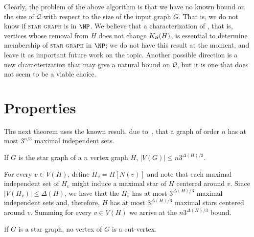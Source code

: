 Clearly, the problem of the above algorithm is that we have no known bound on the size of $\mathcal{Q}$ with respect to the size of the input graph $G$.
That is, we do not know if \textsc{star graph} is in $\NP$.
We believe that a characterization of , that is, vertices whose removal from $H$ does not change $K_{\mathcal{S}}(H)$, is essential to determine membership of \textsc{star graph} in $\NP$; we do not have this result at the moment, and leave it as important future work on the topic.
Another possible direction is a new characterization that may give a natural bound on $\mathcal{Q}$, but it is one that does not seem to be a viable choice.

\section{Properties}

The next theorem uses the known result, due to~\cite{moon_moser}, that a graph of order $n$ has at most $3^{n/3}$ maximal independent sets.

\begin{theorem}
    If $G$ is the star graph of a $n$ vertex graph $H$, $|V(G)| \leq n3^{\Delta(H)/3}$.
\end{theorem}

\begin{tproof}
    For every $v \in V(H)$, define $H_v = H[N(v)]$ and note that each maximal independent set of $H_v$ might induce a maximal star of $H$ centered around $v$.
    Since $|V(H_v)| \leq \Delta(H)$, we have that the $H_v$ has at most $3^{\Delta(H)/3}$ maximal independent sets and, therefore, $H$ has at most $3^{\Delta(H)/3}$ maximal stars centered around $v$.
    Summing for every $v \in V(H)$ we arrive at the $n3^{\Delta(H)/3}$ bound.
\end{tproof}

\begin{theorem}
    \label{thm:star_cutless}
    If $G$ is a star graph, no vertex of $G$ is a cut-vertex.
\end{theorem}

